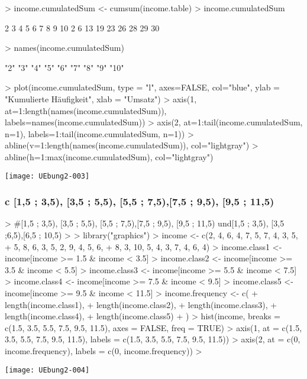 \documentclass{article}
\begin{document}
\begin{Schunk}
\begin{Sinput}
> income.cumulatedSum <- cumsum(income.table)
> income.cumulatedSum
\end{Sinput}
\begin{Soutput}
 2  3  4  5  6  7  8  9 10 
 2  6 13 19 23 26 28 29 30 
\end{Soutput}
\begin{Sinput}
> names(income.cumulatedSum)
\end{Sinput}
\begin{Soutput}
[1] "2"  "3"  "4"  "5"  "6"  "7"  "8"  "9"  "10"
\end{Soutput}
\begin{Sinput}
> plot(income.cumulatedSum, type = "l", axes=FALSE, col="blue", ylab = "Kumulierte Häufigkeit", xlab = "Umsatz")
> axis(1, at=1:length(names(income.cumulatedSum)), labels=names(income.cumulatedSum))
> axis(2, at=1:tail(income.cumulatedSum, n=1), labels=1:tail(income.cumulatedSum, n=1))
> abline(v=1:length(names(income.cumulatedSum)), col="lightgray")
> abline(h=1:max(income.cumulatedSum), col="lightgray")
\end{Sinput}
\end{Schunk}
\texttt{[image: UEbung2-003]}

\subsubsection{c [1,5 ; 3,5), [3,5 ; 5,5), [5,5 ; 7,5),[7,5 ; 9,5), [9,5 ; 11,5)}


\begin{Schunk}
\begin{Sinput}
> #[1,5 ; 3,5), [3,5 ; 5,5), [5,5 ; 7,5),[7,5 ; 9,5), [9,5 ; 11,5) und[1,5 ; 3,5), [3,5 ;6,5),[6,5 ; 10,5) 
> 
> library("graphics")
> income <- c(2, 4, 6, 4, 7, 5, 7, 4, 3, 5,
+             5, 8, 6, 3, 5, 2, 9, 4, 5, 6, 
+             8, 3, 10, 5, 4, 3, 7, 4, 6, 4)
> income.class1 <- income[income >= 1.5 & income < 3.5]
> income.class2 <- income[income >= 3.5 & income < 5.5]
> income.class3 <- income[income >= 5.5 & income < 7.5]
> income.class4 <- income[income >= 7.5 & income < 9.5]
> income.class5 <- income[income >= 9.5 & income < 11.5]
> income.frequency <- c(
+   length(income.class1),
+   length(income.class2),
+   length(income.class3),
+   length(income.class4),
+   length(income.class5)
+ )
> hist(income, breaks = c(1.5, 3.5, 5.5, 7.5, 9.5, 11.5), axes = FALSE, freq = TRUE)
> axis(1, at = c(1.5, 3.5, 5.5, 7.5, 9.5, 11.5), labels = c(1.5, 3.5, 5.5, 7.5, 9.5, 11.5))
> axis(2, at = c(0, income.frequency), labels = c(0, income.frequency))
> 
\end{Sinput}
\end{Schunk}
\texttt{[image: UEbung2-004]}
\end{document}
